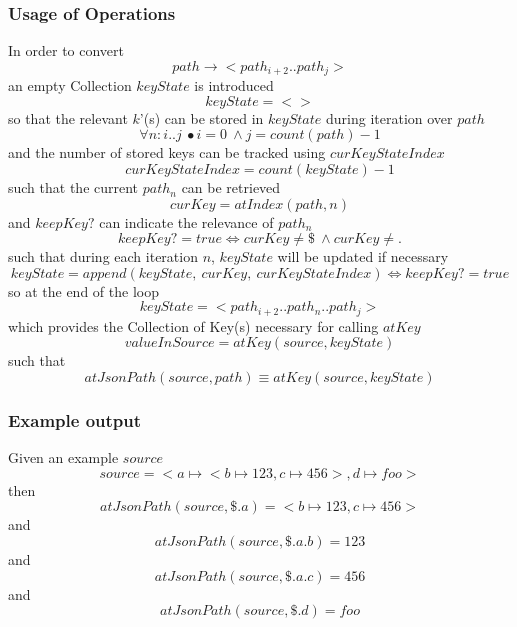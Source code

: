 \documentclass[../main.tex]{subfiles}
\begin{document}
\subsubsection{Usage of Operations}
In order to convert
$$path \to <path_{i+2}..path_{j}>$$
an empty Collection $keyState$ is introduced
$$keyState = <>$$
so that the relevant $k$'(s) can be stored in $keyState$ during iteration over $path$
$$\forall n : i..j \ \bullet i = 0 \ \land j = count(path) - 1$$
and the number of stored keys can be tracked using $curKeyStateIndex$
$$curKeyStateIndex = count(keyState) - 1$$
such that the current $path_{n}$ can be retrieved
$$curKey = atIndex(path, n)$$
and $keepKey?$ can indicate the relevance of $path_{n}$
$$keepKey? = true \iff curKey \not= \$ \ \land curKey \not= . $$
such that during each iteration $n$, $keyState$ will be updated if necessary
$$keyState = append(keyState, \ curKey, \ curKeyStateIndex) \iff keepKey? = true$$
so at the end of the loop
$$keyState = <path_{i+2}..path_{n}..path_{j}>$$
which provides the Collection of Key(s) necessary for calling $atKey$
$$valueInSource = atKey(source, keyState)$$
such that
$$atJsonPath(source,path) \equiv atKey(source, keyState)$$

\subsubsection{Example output}
Given an example $source$
$$source = <a \mapsto <b \mapsto 123, c \mapsto 456>, d \mapsto foo>$$
then
$$atJsonPath(source, \$.a) = <b \mapsto 123, c \mapsto 456>$$
and
$$atJsonPath(source, \$.a.b) = 123$$
and
$$atJsonPath(source, \$.a.c) = 456$$
and
$$atJsonPath(source, \$.d) = foo$$
\end{document}
